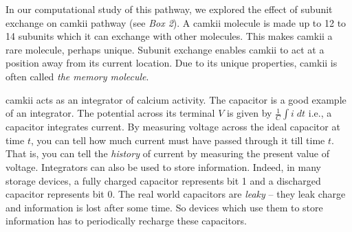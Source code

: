 \documentclass[]{resonance}
\begin{document}

In our computational study of this pathway, we explored the effect of subunit
exchange on \gls{camkii} pathway \cite{SinghAndBhalla2018} (see \textit{Box 2}).
A \gls{camkii} molecule is made up to 12 to 14 subunits which it can exchange
with other molecules. This makes \gls{camkii} a rare molecule, perhaps unique.
Subunit exchange enables \gls{camkii} to act at a position away from its current
location. Due to its unique properties, \gls{camkii} is often called \emph{the
memory molecule}.

\gls{camkii} acts as an integrator of calcium activity. The capacitor is a good
example of an integrator. The potential across its terminal $V$ is given by
$\frac{1}{C}\int i\; dt$ i.e., a capacitor integrates current. By measuring
voltage across the ideal capacitor at time $t$, you can tell how much current
must have passed through it till time $t$. That is, you can tell the
\emph{history} of current by measuring the present value of voltage. Integrators
can also be used to store information. 
Indeed, in many storage devices, a fully
charged capacitor represents bit 1 and a discharged capacitor represents bit 0.
The real world capacitors are \emph{leaky} -- they leak charge and information
is lost after some time. So devices which use them to store information has to
periodically recharge these capacitors.
\end{document}
